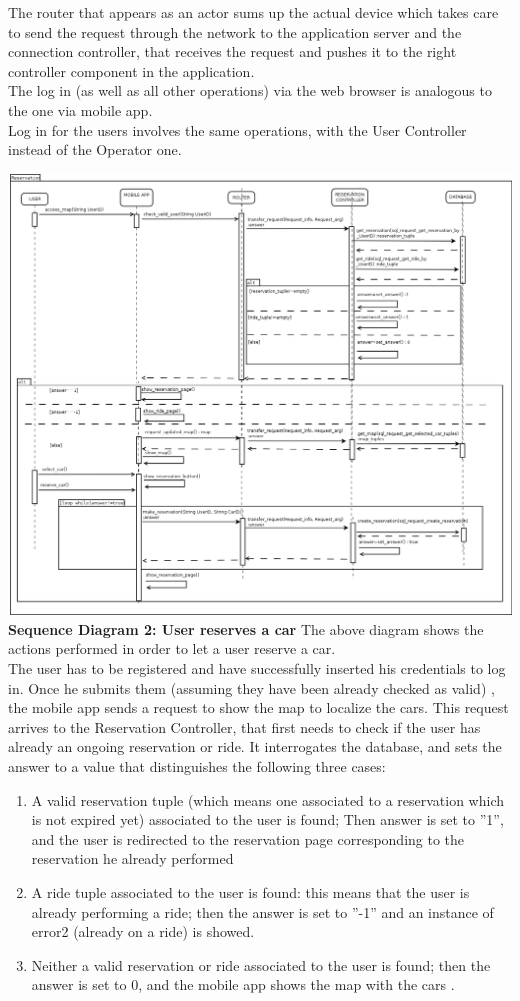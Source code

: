 \documentclass{article}
\begin{document}
\begin{flushleft}
The router that appears as an actor sums up the actual device which takes care to send the request through the network to the application server and the connection controller, that receives the request and pushes it to the right controller component in the application.\\
The log in (as well as all other operations) via the web browser is analogous to the one via mobile app.\\
Log in for the users involves the same operations, with the User Controller instead of the Operator one.



\newpage
\includegraphics[scale=0.3]{seq2_reservation} 
\newpage
\textbf{Sequence Diagram 2: User reserves a car}
\break
The above diagram shows the actions performed in order to let a user reserve a car. \\
The user has to be registered and have successfully inserted his credentials to log in. Once he submits them (assuming they have been already checked as valid) , the mobile app sends a request to show the map to localize the cars. This request arrives to the Reservation Controller, that first needs to check if the user has already an ongoing reservation or ride. It interrogates the database, and sets the answer to a value that distinguishes the following three cases:
\begin{enumerate}
\item A valid reservation tuple (which means one associated to a reservation which is not expired yet) associated to the user is found; Then answer is set to ''1'', and the user is redirected to the reservation page corresponding to the reservation he already performed
\item A ride tuple associated to the user is found: this means that the user is already performing a ride; then the answer is set to ''-1'' and an instance of error2 (already on a ride) is showed.
\item Neither a valid reservation or ride associated to the user is found; then the answer is set to 0, and the mobile app shows the map with the cars . 
\end{enumerate} 


\end{flushleft}
\end{document}
